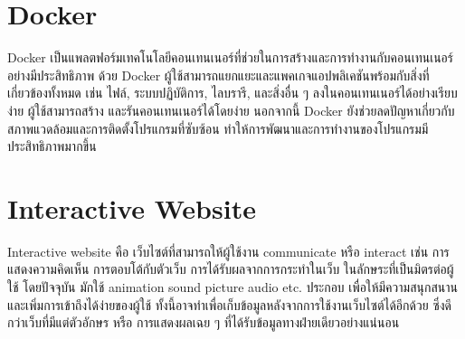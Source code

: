 \section{Docker}
Docker เป็นแพลตฟอร์มเทคโนโลยีคอนเทนเนอร์ที่ช่วยในการสร้างและการทำงานกับคอนเทนเนอร์อย่างมีประสิทธิภาพ ด้วย Docker 
ผู้ใช้สามารถแยกแยะและแพคเกจแอปพลิเคชันพร้อมกับสิ่งที่เกี่ยวข้องทั้งหมด เช่น ไฟล์, ระบบปฏิบัติการ, ไลบรารี, และสิ่งอื่น ๆ 
ลงในคอนเทนเนอร์ได้อย่างเรียบง่าย ผู้ใช้สามารถสร้าง และรันคอนเทนเนอร์ได้โดยง่าย นอกจากนี้ Docker 
ยังช่วยลดปัญหาเกี่ยวกับสภาพแวดล้อมและการติดตั้งโปรแกรมที่ซับซ้อน ทำให้การพัฒนาและการทำงานของโปรแกรมมีประสิทธิภาพมากขึ้น 

\section{Interactive Website}
Interactive website คือ เว็บไซต์ที่สามารถให้ผู้ใช้งาน communicate หรือ interact เช่น การแสดงความคิดเห็น การตอบโต้กับตัวเว็บ 
การได้รับผลจากการกระทําในเว็บ ในลักษระที่เป็นมิตรต่อผู้ใช้ โดยปัจจุบัน มักใช้ animation sound picture audio etc. ประกอบ 
เพื่อให้มีความสนุกสนานและเพิ่มการเข้าถึงได้ง่ายของผู้ใช้ ทั้งนี้อาจทําเพื่อเก็บข้อมูลหลังจากการใช้งานเว็บไซต์ได้อีกด้วย ซึ่งดีกว่าเว็บที่มีแต่ตัวอักษร หรือ 
การแสดงผลเฉย ๆ ที่ได้รับข้อมูลทางฝ่ายเดียวอย่างแน่นอน





